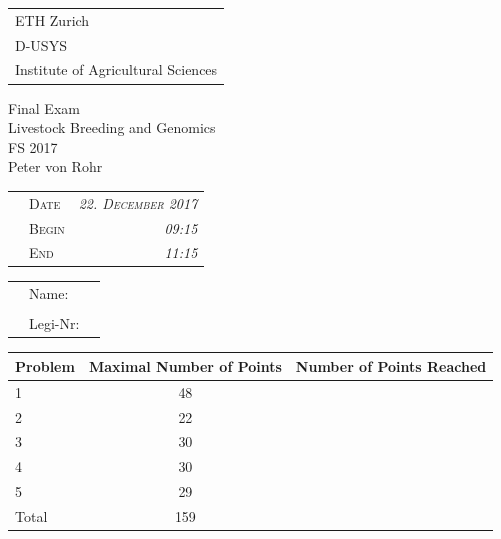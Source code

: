 \documentclass[]{article}
\title{}
\author{}
\date{}
\begin{document}
\thispagestyle{empty}

\begin{tabular}{l}
ETH Zurich \\
D-USYS\\
Institute of Agricultural Sciences\\
\end{tabular}

\vspace{15ex}

\begin{center}
\huge
Final Exam  \\ \vspace{1ex}
Livestock Breeding and Genomics \\  \vspace{1ex}
FS 2017 \\

\normalsize
\vspace{7ex}
Peter von Rohr 
\end{center}

\vspace{7ex}

\begin{tabular}{p{5cm}lr}
  & \textsc{Date}  & \textsc{\emph{22. December 2017}} \\
  & \textsc{Begin} & \textsc{\emph{09:15 }}\\
  & \textsc{End}   & \textsc{\emph{11:15 }}\\ 
\end{tabular}

\vspace{5ex} \large

\begin{tabular}{p{2.5cm}p{3cm}p{6cm}}
  &  Name:     &  \\
  &            &  \\
  &  Legi-Nr:  & \\
\end{tabular}

\normalsize

\vspace{9ex}

\begin{center}
\begin{tabular}{|p{3cm}|c|c|}
\hline
Problem  &  Maximal Number of Points  &  Number of Points Reached \\
\hline
1        &  48         & \\
\hline
2        &  22         & \\
\hline
3        &  30         & \\
\hline
4        &  30          & \\
\hline
5        &  29          & \\
\hline
Total    &  159    & \\
\hline
\end{tabular}
\end{center}
\end{document}
